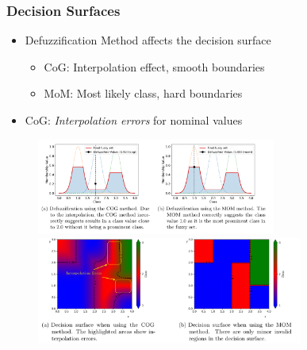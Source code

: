 \documentclass[
	10pt,
	t		%
]{beamer}
\begin{document}
\begin{frame}

	\frametitle{Decision Surfaces}
	
	\begin{itemize}
		\item Defuzzification Method affects the decision surface
		      \begin{itemize}
			      \item CoG: Interpolation effect, smooth boundaries
			      \item MoM: Most likely class, hard boundaries
		      \end{itemize}
		\item CoG: \textit{Interpolation errors} for nominal values
	\end{itemize}
	
	\vspace{-0.2cm}
	
	\begin{figure}
		\centering
		\includegraphics[width=0.7\textwidth, trim={1.2cm 4.8cm 2.9cm 0cm},clip]{figures/cog-vs-mom.png}
		
		\includegraphics[width=0.78\textwidth, trim={0 3.7cm 2.3cm 0cm},clip]{figures/decision-surfaces.png}
	\end{figure}
	
\end{frame}
\end{document}
